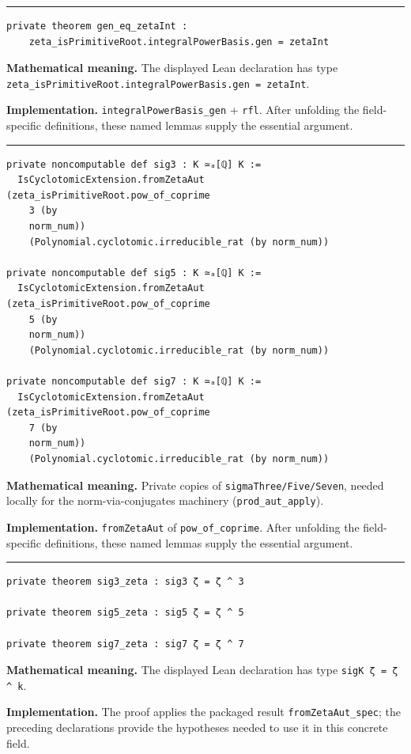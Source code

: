 \documentclass[UTF8,a4paper,11pt,fontset=fandol]{ctexart}
\theoremstyle{definition}
\newcommand{\statementsep}{\par\medskip\hrule\medskip}
\begin{document}
\statementsep
\begin{verbatim}
private theorem gen_eq_zetaInt :
    zeta_isPrimitiveRoot.integralPowerBasis.gen = zetaInt
\end{verbatim}
\noindent\textbf{Mathematical meaning.} The displayed Lean declaration has type \texttt{zeta\_\allowbreak{}isPrimitiveRoot.\allowbreak{}integralPowerBasis.\allowbreak{}gen = zetaInt}.\par
\noindent\textbf{Implementation.} \texttt{integralPowerBasis\_\allowbreak{}gen} + \texttt{rfl}. After unfolding the field-specific definitions, these named lemmas supply the essential argument.\par
\statementsep
\begin{verbatim}
private noncomputable def sig3 : K ≃ₐ[ℚ] K :=
  IsCyclotomicExtension.fromZetaAut (zeta_isPrimitiveRoot.pow_of_coprime
    3 (by
    norm_num))
    (Polynomial.cyclotomic.irreducible_rat (by norm_num))

private noncomputable def sig5 : K ≃ₐ[ℚ] K :=
  IsCyclotomicExtension.fromZetaAut (zeta_isPrimitiveRoot.pow_of_coprime
    5 (by
    norm_num))
    (Polynomial.cyclotomic.irreducible_rat (by norm_num))

private noncomputable def sig7 : K ≃ₐ[ℚ] K :=
  IsCyclotomicExtension.fromZetaAut (zeta_isPrimitiveRoot.pow_of_coprime
    7 (by
    norm_num))
    (Polynomial.cyclotomic.irreducible_rat (by norm_num))
\end{verbatim}
\noindent\textbf{Mathematical meaning.} Private copies of \texttt{sigmaThree/\allowbreak{}Five/\allowbreak{}Seven}, needed locally for the norm-via-conjugates machinery (\texttt{prod\_\allowbreak{}aut\_\allowbreak{}apply}).\par
\noindent\textbf{Implementation.} \texttt{fromZetaAut} of \texttt{pow\_\allowbreak{}of\_\allowbreak{}coprime}. After unfolding the field-specific definitions, these named lemmas supply the essential argument.\par
\statementsep
\begin{verbatim}
private theorem sig3_zeta : sig3 ζ = ζ ^ 3

private theorem sig5_zeta : sig5 ζ = ζ ^ 5

private theorem sig7_zeta : sig7 ζ = ζ ^ 7
\end{verbatim}
\noindent\textbf{Mathematical meaning.} The displayed Lean declaration has type \texttt{sigK ζ = ζ \textasciicircum{} k}.\par
\noindent\textbf{Implementation.} The proof applies the packaged result \texttt{fromZetaAut\_\allowbreak{}spec}; the preceding declarations provide the hypotheses needed to use it in this concrete field.\par
\end{document}
